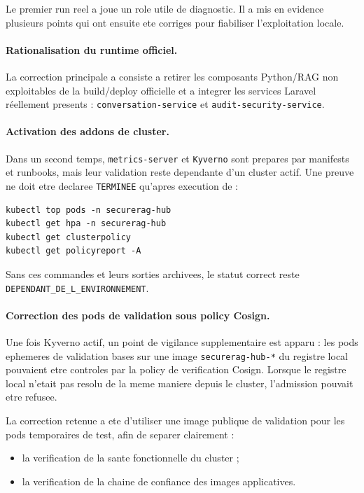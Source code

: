 Le premier run reel a joue un role utile de diagnostic. Il a mis en evidence plusieurs points qui ont ensuite ete corriges pour fiabiliser l'exploitation locale.

\paragraph{Rationalisation du runtime officiel.}
La correction principale a consiste a retirer les composants Python/RAG non exploitables de la build/deploy officielle et a integrer les services Laravel réellement presents : \texttt{conversation-service} et \texttt{audit-security-service}.

\paragraph{Activation des addons de cluster.}
Dans un second temps, \texttt{metrics-server} et \texttt{Kyverno} sont prepares par manifests et runbooks, mais leur validation reste dependante d'un cluster actif. Une preuve ne doit etre declaree \texttt{TERMINEE} qu'apres execution de :

\begin{verbatim}
kubectl top pods -n securerag-hub
kubectl get hpa -n securerag-hub
kubectl get clusterpolicy
kubectl get policyreport -A
\end{verbatim}

Sans ces commandes et leurs sorties archivees, le statut correct reste \texttt{DEPENDANT\_DE\_L\_ENVIRONNEMENT}.

\paragraph{Correction des pods de validation sous policy Cosign.}
Une fois Kyverno actif, un point de vigilance supplementaire est apparu : les pods ephemeres de validation bases sur une image \texttt{securerag-hub-*} du registre local pouvaient etre controles par la policy de verification Cosign. Lorsque le registre local n'etait pas resolu de la meme maniere depuis le cluster, l'admission pouvait etre refusee.

La correction retenue a ete d'utiliser une image publique de validation pour les pods temporaires de test, afin de separer clairement :

\begin{itemize}
  \item la verification de la sante fonctionnelle du cluster ;
  \item la verification de la chaine de confiance des images applicatives.
\end{itemize}

